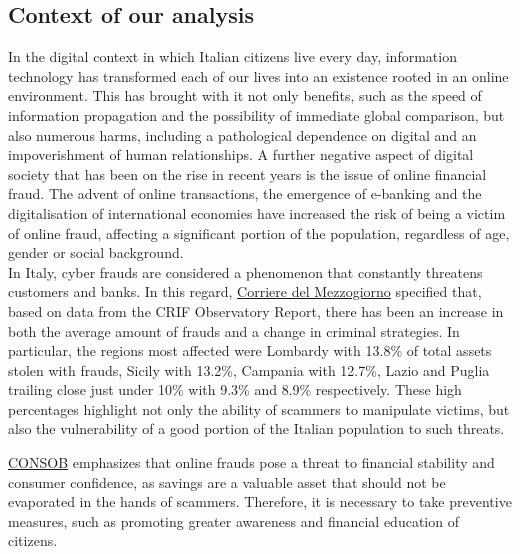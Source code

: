\documentclass[a4paper,11pt]{article}
\begin{document}
\subsection{Context of our analysis}
In the digital context in which Italian citizens live every day, information technology has transformed each of our lives into an existence rooted in an online environment. This has brought with it not only benefits, such as the speed of information propagation and the possibility of immediate global comparison, but also numerous harms, including a pathological dependence on digital and an impoverishment of human  relationships. A further negative aspect of digital society that has been on the rise in recent years is the issue of online financial fraud. The advent of online transactions, the emergence of e-banking and the digitalisation of international economies have increased the risk of being a victim of online fraud, affecting a significant portion of the population, regardless of age, gender or social background.\\

In Italy, cyber frauds are considered a phenomenon that constantly threatens customers and banks. In this regard, \href{https://bari.corriere.it/notizie/cronaca/24_settembre_01/conti-correnti-svuotati-con-un-clic-allarme-in-puglia-e-la-quinta-regione-in-italia-in-tanti-si-ritrovano-indebitati-66eb1381-4012-41ef-81d3-ec118796fxlk.shtml?appunica=true&app_v2=true}{Corriere del Mezzogiorno} \cite{CdM} specified that, based on data from the CRIF Observatory Report, there has been an increase in both the average amount of frauds and a change in criminal strategies. In particular, the regions most affected were Lombardy with 13.8\% of total assets stolen with frauds, Sicily with 13.2\%, Campania  with 12.7\%, Lazio and Puglia trailing close just under 10\% with 9.3\% and 8.9\% respectively. These high percentages highlight not only the ability of scammers to manipulate victims, but also the vulnerability of a good portion of the Italian population to such threats. 


\href{https://www.consob.it/web/investor-education/truffe}{CONSOB} \cite{Consob} emphasizes that online frauds pose a threat to financial stability and consumer confidence, as savings are a valuable asset that should not be evaporated in the hands of scammers. Therefore, it is necessary to take preventive measures, such as promoting greater awareness and financial education of citizens.\\
\end{document}
